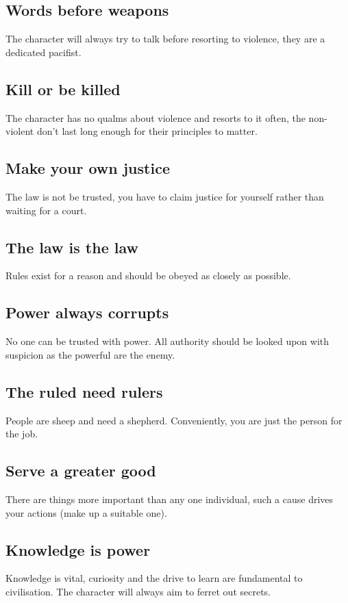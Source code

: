 \documentclass[a4paper,10pt,oneside]{book}
\begin{document}
\subsection{Words before weapons}
The character will always try to talk before resorting to violence, they are a dedicated pacifist.

\subsection{Kill or be killed}
The character has no qualms about violence and resorts to it often, the non-violent don't last long enough for their principles to matter.

\subsection{Make your own justice}
The law is not be trusted, you have to claim justice for yourself rather than waiting for a court. 

\subsection{The law is the law}
Rules exist for a reason and should be obeyed as closely as possible.

\subsection{Power always corrupts}
No one can be trusted with power. All authority should be looked upon with suspicion as the powerful are the enemy.

\subsection{The ruled need rulers}
People are sheep and need a shepherd. Conveniently, you are just the person for the job.

\subsection{Serve a greater good}
There are things more important than any one individual, such a cause drives your actions (make up a suitable one).

\subsection{Knowledge is power}
Knowledge is vital, curiosity and the drive to learn are fundamental to civilisation. The character will always aim to ferret out secrets.
\end{document}
